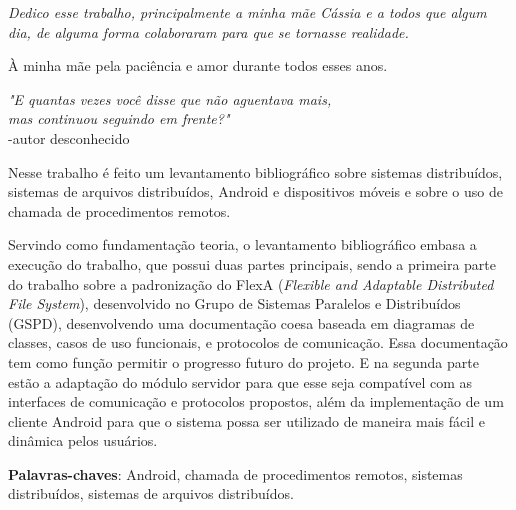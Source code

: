 \documentclass[
	12pt,
	openright,
	oneside,
	a4paper,
	english,
	brazil
	]{abntex2}
\begin{document}

\begin{dedicatoria}
   \vspace*{\fill}
   \centering
   \noindent
   \textit{ Dedico esse trabalho, principalmente a minha mãe Cássia e a todos que algum dia, de alguma forma colaboraram para que se tornasse realidade.} \vspace*{\fill}
\end{dedicatoria}



\begin{agradecimentos}
À minha mãe pela paciência e amor durante todos esses anos.

\end{agradecimentos}



\begin{epigrafe}
    \vspace*{\fill}
	\begin{flushright}
		\textit{"E quantas vezes você disse que não aguentava mais,\\ mas continuou seguindo em frente?"} \\
		-autor desconhecido
	\end{flushright}
\end{epigrafe}


\setlength{\absparsep}{18pt} %
\begin{resumo}
 
    Nesse trabalho é feito um levantamento bibliográfico sobre sistemas distribuídos, sistemas de arquivos distribuídos, Android e dispositivos móveis e sobre o uso de chamada de procedimentos remotos. 
 
    Servindo como fundamentação teoria, o levantamento bibliográfico embasa a execução do trabalho, que possui duas partes principais, sendo a primeira parte do trabalho sobre a padronização do FlexA (\textit{Flexible and Adaptable Distributed File System}), desenvolvido no Grupo de Sistemas Paralelos e Distribuídos (GSPD), desenvolvendo uma documentação coesa baseada em diagramas de classes, casos de uso funcionais, e protocolos de comunicação. Essa documentação tem como função permitir o progresso futuro do projeto. E na segunda parte estão a adaptação do módulo servidor para que esse seja compatível com as interfaces de comunicação e protocolos propostos, além da implementação de um cliente Android para que o sistema possa ser utilizado de maneira mais fácil e dinâmica pelos usuários.
   \vspace{\onelineskip}
 
 \textbf{Palavras-chaves}: Android, chamada de procedimentos remotos, sistemas distribuídos, sistemas de arquivos distribuídos.
\end{resumo}
\end{document}
